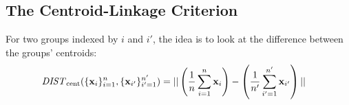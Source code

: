 \documentclass[12pt,letterpaper]{article}
\begin{document}
\subsection{The Centroid-Linkage Criterion}
For two groups indexed by $i$ and $i'$, the idea is to look at the difference between the groups' centroids:
\begin{align*}
	 \mathit{DIST}_{\mathrm{cent}}(\{\mathbf{x}_i\}_{i=1}^{n}, \{\mathbf{x}_{i'}\}_{i'=1}^{n'})
&= ||\left( \frac{1}{n} \sum_{i=1}^{n} \mathbf{x}_i \right) - \left( \frac{1}{n'} \sum_{i'=1}^{n'} \mathbf{x}_{i'} \right)||
\end{align*}

\newpage
\end{document}
